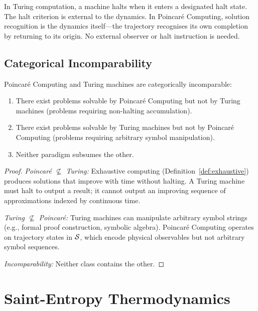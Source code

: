 \begin{remark}
In Turing computation, a machine halts when it enters a designated halt state. The halt criterion is external to the dynamics. In Poincar\'{e} Computing, solution recognition is the dynamics itself---the trajectory recognises its own completion by returning to its origin. No external observer or halt instruction is needed.
\end{remark}

\subsection{Categorical Incomparability}

\begin{theorem}
\label{thm:incomparability}
Poincar\'{e} Computing and Turing machines are categorically incomparable:
\begin{enumerate}
    \item There exist problems solvable by Poincar\'{e} Computing but not by Turing machines (problems requiring non-halting accumulation).
    \item There exist problems solvable by Turing machines but not by Poincar\'{e} Computing (problems requiring arbitrary symbol manipulation).
    \item Neither paradigm subsumes the other.
\end{enumerate}
\end{theorem}

\begin{proof}
\emph{Poincar\'{e} $\not\subseteq$ Turing:} Exhaustive computing (Definition~\ref{def:exhaustive}) produces solutions that improve with time without halting. A Turing machine must halt to output a result; it cannot output an improving sequence of approximations indexed by continuous time.

\emph{Turing $\not\subseteq$ Poincar\'{e}:} Turing machines can manipulate arbitrary symbol strings (e.g., formal proof construction, symbolic algebra). Poincar\'{e} Computing operates on trajectory states in $\mathcal{S}$, which encode physical observables but not arbitrary symbol sequences.

\emph{Incomparability:} Neither class contains the other.
\end{proof}

\section{Saint-Entropy Thermodynamics}
\label{sec:saint_entropy}

